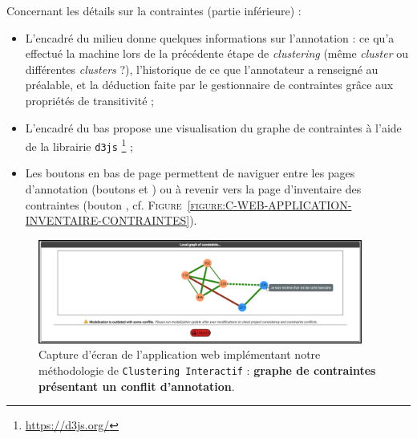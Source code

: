 		Concernant les détails sur la contraintes (partie inférieure) :
		\begin{itemize}
			\item L'encadré du milieu donne quelques informations sur l'annotation : ce qu'a effectué la machine lors de la précédente étape de \textit{clustering} (même \textit{cluster} ou différentes \textit{clusters} ?), l'historique de ce que l'annotateur a renseigné au préalable, et la déduction faite par le gestionnaire de contraintes grâce aux propriétés de transitivité ;
			\item L'encadré du bas propose une visualisation du graphe de contraintes à l'aide de la librairie \texttt{d3js} \footnote {
				\url{https://d3js.org/}
			} ;
			\item Les boutons en bas de page permettent de naviguer entre les pages d'annotation (boutons \textguillemets{\faAngleLeft} et \textguillemets{\faAngleRight}) ou à revenir vers la page d'inventaire des contraintes (bouton \textguillemets{\faList}, cf. \textsc{Figure~\ref{figure:C-WEB-APPLICATION-INVENTAIRE-CONTRAINTES}}).
		\end{itemize}
		
		\begin{figure}[H]
			\centering
			\includegraphics[width=0.95\textwidth]{figures/interactive-clustering-application-annotation-4conflit}
			\caption{
				Capture d'écran de l'application web implémentant notre méthodologie de \texttt{Clustering Interactif} : \textbf{graphe de contraintes présentant un conflit d'annotation}.
			}
			\label{figure:C-WEB-APPLICATION-CONFLIT}
		\end{figure}
		
